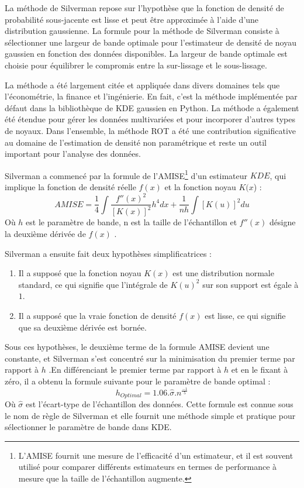 La méthode de Silverman repose sur l'hypothèse que la fonction de densité de probabilité sous-jacente est lisse et peut être approximée à l'aide d'une distribution gaussienne. La formule pour la méthode de Silverman consiste à sélectionner une largeur de bande optimale pour l'estimateur de densité de noyau gaussien en fonction des données disponibles. La largeur de bande optimale est choisie pour équilibrer le compromis entre la sur-lissage et le sous-lissage.

La méthode a été largement citée et appliquée dans divers domaines tels que l'économétrie, la finance et l'ingénierie. En fait, c'est la méthode implémentée par défaut dans la bibliothèque de KDE gaussien en Python. La méthode a également été étendue pour gérer les données multivariées et pour incorporer d'autres types de noyaux. Dans l'ensemble, la méthode ROT a été une contribution significative au domaine de l'estimation de densité non paramétrique et reste un outil important pour l'analyse des données.

Silverman a commencé par la formule de l'AMISE\footnote{L’AMISE fournit une mesure de l’efficacité d’un estimateur, et il est souvent utilisé pour comparer différents estimateurs en termes de performance à mesure que la taille de l’échantillon augmente.}  d'un estimateur $KDE$, qui implique la fonction de densité réelle $f(x)$  et la fonction noyau $K(x$) :
\begin{equation}
AMISE = \frac{1}{4} \int \frac{f''(x)^2}{[K(x)]^2} h^4 dx + \frac{1}{nh} \int [K(u)]^2 du
\end{equation}
Où $h$ est le paramètre de bande, n est la taille de l'échantillon et $f''(x)$ désigne la deuxième dérivée de $f(x)$ .

Silverman a ensuite fait deux hypothèses simplificatrices :
\begin{enumerate}
\item Il a supposé que la fonction noyau $K(x)$  est une distribution normale standard, ce qui signifie que l'intégrale de $K(u)^2$  sur son support est égale à $1$.
\item Il a supposé que la vraie fonction de densité $f(x)$  est lisse, ce qui signifie que sa deuxième dérivée est bornée.
\end{enumerate}

Sous ces hypothèses, le deuxième terme de la formule AMISE devient une constante, et Silverman s'est concentré sur la minimisation du premier terme par rapport à $h$ .En différenciant le premier terme par rapport à $h$ et en le fixant à zéro, il a obtenu la formule suivante pour le paramètre de bande optimal :
\begin{equation}
h_{Optimal} = 1.06 . \hat{\sigma} .  n^{\frac{-1}{5}}\end{equation}
Où  $\hat{\sigma}$ est l'écart-type de l'échantillon des données. Cette formule est connue sous le nom de règle de Silverman et elle fournit une méthode simple et pratique pour sélectionner le paramètre de bande dans KDE.

